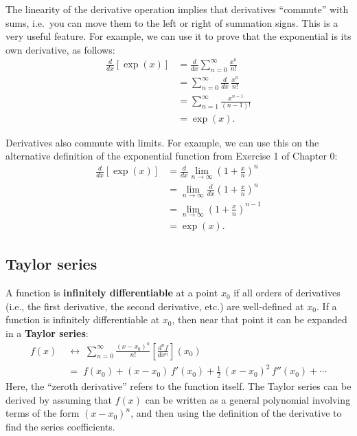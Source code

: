 \documentclass[10pt,a4paper]{article}
\begin{document}
The linearity of the derivative operation implies that derivatives
``commute'' with sums, i.e.~you can move them to the left or right of
summation signs. This is a very useful feature. For example, we can
use it to prove that the exponential is its own derivative, as
follows:
\begin{align}
  \frac{d}{dx} \left[\exp(x)\right]
  &= \frac{d}{dx} \sum_{n=0}^\infty\frac{x^n}{n!} \\
  &= \sum_{n=0}^\infty\frac{d}{dx} \, \frac{x^n}{n!} \\
  &= \sum_{n=1}^\infty \frac{x^{n-1}}{(n-1)!} \\
  &=\exp(x).
\end{align}

Derivatives also commute with limits. For example, we can use this on
the alternative definition of the exponential function from Exercise 1
of Chapter 0:
\begin{align}
  \frac{d}{dx} \left[\exp(x)\right]
  &= \frac{d}{dx} \lim_{n\rightarrow\infty} \left(1+\frac{x}{n}\right)^n \\
  &= \lim_{n\rightarrow\infty} \frac{d}{dx} \left(1+\frac{x}{n}\right)^n \\
  &= \lim_{n\rightarrow\infty} \left(1+\frac{x}{n}\right)^{n-1} \\
  &= \exp(x).
\end{align}

\subsection{Taylor series}\label{taylor-series}

A function is \textbf{infinitely differentiable} at a point $x_0$ if
all orders of derivatives (i.e., the first derivative, the second
derivative, etc.) are well-defined at $x_0$. If a function is
infinitely differentiable at $x_0$, then near that point it can be
expanded in a \textbf{Taylor series}:
\begin{align}
  f(x) \;&\leftrightarrow\; \sum_{n=0}^\infty \frac{(x-x_0)^n}{n!} \left[\frac{d^nf}{dx^n}\right](x_0) \\
  &=\; f(x_0) + (x-x_0)\, f'(x_0) + \frac{1}{2}\, (x-x_0)^2\, f''(x_0) + \cdots
\end{align}
Here, the ``zeroth derivative'' refers to the function itself. The
Taylor series can be derived by assuming that $f(x)$ can be written as
a general polynomial involving terms of the form $(x-x_0)^n$, and then
using the definition of the derivative to find the series
coefficients.
\end{document}

